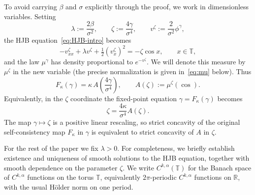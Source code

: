 \documentclass{amsart}
\newcommand{\T}{\mathbb T}
\begin{document}
To avoid carrying $\beta$ and $\sigma$ explicitly through the proof,
we work in dimensionless variables. Setting
\[
\lambda:=\frac{2\beta}{\sigma^2},\qquad
\zeta:=\frac{4\gamma}{\sigma^4},\qquad
v^\zeta:=\frac{2}{\sigma^2}\phi^\gamma ,
\]
the HJB equation~\eqref{eq:HJB-intro} becomes
\begin{equation}\label{eq:HJB}
-v^\zeta_{xx}+\lambda v^\zeta+\tfrac12(v^\zeta_x)^2=-\zeta\cos x,
\qquad x\in\T,
\end{equation}
and the law $\mu^\gamma$ has density proportional to $e^{-v^\zeta}$. We will denote this measure by $\mu^\zeta$ in the new variable (the precise normalization is given in~\eqref{eq:mu} below). Thus
\[
F_\kappa(\gamma)=\kappa\,A\!\left(\frac{4\gamma}{\sigma^4}\right),
\qquad A(\zeta):=\mu^\zeta(\cos).
\] Equivalently, in the $\zeta$ coordinate the
fixed-point equation $\gamma=F_\kappa(\gamma)$ becomes
\[
\zeta=\frac{4\kappa}{\sigma^4}A(\zeta).
\]
The map $\gamma\mapsto\zeta$ is a positive linear rescaling, so strict
concavity of the original self-consistency map $F_\kappa$ in $\gamma$
is equivalent to strict concavity of $A$ in $\zeta$.

For the rest of the paper we fix $\lambda>0$. For completeness, we briefly establish existence and uniqueness of smooth solutions to the HJB equation, together with smooth dependence on the parameter $\zeta$. We write $C^{k,\alpha}(\T)$ for the Banach space of $C^{k,\alpha}$ functions on the torus $\T$, equivalently $2\pi$-periodic $C^{k,\alpha}$ functions on $\mathbb R$, with the usual H\"older norm on one period.
\end{document}
